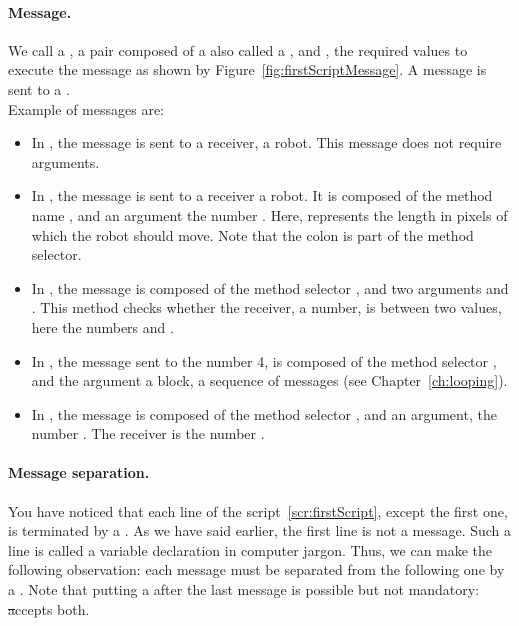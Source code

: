 \paragraph{Message.}
We call a , a pair composed of a  also called a , and , the required values to execute the message  as shown by Figure~\ref{fig:firstScriptMessage}. A message is sent to a . \\

\noindent
Example of messages are:
\begin{itemize}
\item In , the message  is sent to a receiver, a robot. This message does not require arguments.

\item In , the message   is sent to a receiver a robot. It is composed of the method  name , and an argument the number . Here,  represents the length in pixels of which the robot should move.  Note
that the colon is part of the method selector.

\item In , the message  is composed of  the method selector , and two arguments  and . This method checks whether the receiver, a number, is between two values, here the numbers  and .

\item In , the message  sent to the number 4, is composed of  the method selector \timesRepeat, and the argument \ct{[ pica go: 100 ]} a block, a sequence of messages (see Chapter~\ref{ch:looping}).

\item In , the message  is composed of the method selector \ct{+}, and an argument, the number . The receiver is the number .
\end{itemize}



\paragraph{Message separation.}
You have noticed that each line of the script~\ref{scr:firstScript}, except the first one, is terminated by a \period. As we have said earlier, the first line is not a message. Such a line is called a  variable declaration in computer jargon. Thus, we can make the following observation: each message must be separated from the following one by a \period. Note that putting a \period after the last message is possible but not mandatory: \st accepts both.

